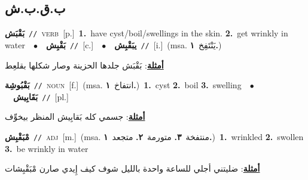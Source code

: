 \documentclass[10pt,a4paper,twoside]{article} %
\begin{document}
\begin{multicols}{2}
\vspace{-3mm}
\subsection*{\color{blue}\foreignlanguage{arabic}{ب.ق.ب.ش}\color{blue}{}} 

{\setlength\topsep{0pt}\textbf{\foreignlanguage{arabic}{بَقْبَش}}\ {\color{gray}\texttt{//}\color{black}}\ \textsc{verb}\ [p.]\ \textbf{1.}~have cyst/boil/swellings in the skin.  \textbf{2.}~get wrinkly in water\ \ $\bullet$\ \ \setlength\topsep{0pt}\textbf{\foreignlanguage{arabic}{بَقْبِش}}\ {\color{gray}\texttt{//}\color{black}}\ [c.]\ \ $\bullet$\ \ \setlength\topsep{0pt}\textbf{\foreignlanguage{arabic}{يبَقْبِش}}\ {\color{gray}\texttt{//}\color{black}}\ [i.]\ \color{gray}(msa. \foreignlanguage{arabic}{يَنْتَفِخ}~\foreignlanguage{arabic}{\textbf{١.}})\color{black}\  \begin{flushright}\color{gray}\foreignlanguage{arabic}{\textbf{\underline{\foreignlanguage{arabic}{أمثلة}}}: بَقْبَش جلدها الحزينة وصار شكلها بقلعِط}\end{flushright}\color{black}} \vspace{2mm}

{\setlength\topsep{0pt}\textbf{\foreignlanguage{arabic}{بَقْبُوشِة}}\ {\color{gray}\texttt{//}\color{black}}\ \textsc{noun}\ [f.]\ \color{gray}(msa. \foreignlanguage{arabic}{انتفاخ}~\foreignlanguage{arabic}{\textbf{١.}})\color{black}\ \textbf{1.}~cyst  \textbf{2.}~boil  \textbf{3.}~swelling\ \ $\bullet$\ \ \setlength\topsep{0pt}\textbf{\foreignlanguage{arabic}{بَقَابِيش}}\ {\color{gray}\texttt{//}\color{black}}\ [pl.]\  \begin{flushright}\color{gray}\foreignlanguage{arabic}{\textbf{\underline{\foreignlanguage{arabic}{أمثلة}}}: جسمي كله بَقابِيش المنظر بيخوِّف}\end{flushright}\color{black}} \vspace{2mm}

{\setlength\topsep{0pt}\textbf{\foreignlanguage{arabic}{مْبَقْبِش}}\ {\color{gray}\texttt{//}\color{black}}\ \textsc{adj}\ [m.]\ \color{gray}(msa. \foreignlanguage{arabic}{منتفخة}~\foreignlanguage{arabic}{\textbf{٣.}}  \foreignlanguage{arabic}{متورمة}~\foreignlanguage{arabic}{\textbf{٢.}}  \foreignlanguage{arabic}{متجعد}~\foreignlanguage{arabic}{\textbf{١.}})\color{black}\ \textbf{1.}~wrinkled  \textbf{2.}~swollen  \textbf{3.}~be wrinkly in water\  \begin{flushright}\color{gray}\foreignlanguage{arabic}{\textbf{\underline{\foreignlanguage{arabic}{أمثلة}}}: ضليتني أجلي للساعة واحدة بالليل شوف كيف إِيدي صارن مْبَقْبِشات}\end{flushright}\color{black}} \vspace{2mm}


\end{multicols}
\end{document}
